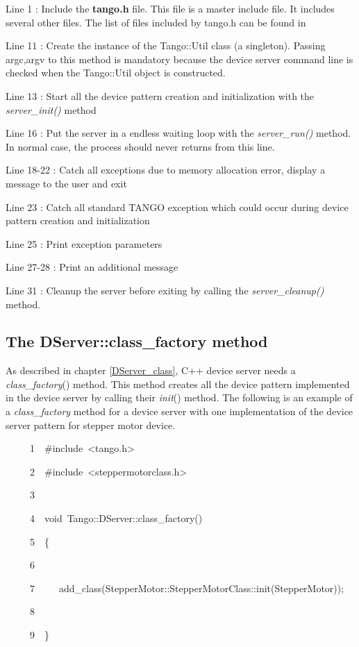 

Line 1 : Include the \textbf{tango.h} file. This file is a master
include file. It includes several other files. The list of files included
by tango.h can be found in \cite{TANGO_ref_man}

Line 11 : Create the instance of the Tango::Util class
(a singleton). Passing argc,argv to this method is mandatory because
the device server command line is checked when the Tango::Util object
is constructed.

Line 13 : Start all the device pattern creation and initialization
with the \emph{server\_init()} method

Line 16 : Put the server in a endless waiting loop with the \emph{server\_run()}
method. In normal case, the process should never returns from this
line.

Line 18-22 : Catch all exceptions due to memory allocation error,
display a message to the user and exit

Line 23 : Catch all standard TANGO exception which could occur during
device pattern creation and initialization

Line 25 : Print exception parameters

Line 27-28 : Print an additional message

Line 31 : Cleanup the server before exiting by calling the \emph{server\_cleanup()}
method.


\subsection{The DServer::class\_factory method}

As described in chapter \ref{DServer_class}, C++ device server needs
a \emph{class\_factory}() method. This method creates all the device
pattern implemented in the device server by calling their \emph{init}()
method. The following is an example of a \emph{class\_factory}
method for a device server with one implementation of the device server
pattern for stepper motor device.


\begin{lyxcode}
~~~~~1~~\#include~<tango.h>

~~~~~2~~\#include~<steppermotorclass.h>

~~~~~3~~

~~~~~4~~void~Tango::DServer::class\_factory()

~~~~~5~~\{

~~~~~6~~

~~~~~7~~~~~add\_class(StepperMotor::StepperMotorClass::init(\textquotedbl{}StepperMotor\textquotedbl{}));

~~~~~8~~

~~~~~9~~\}
\end{lyxcode}


